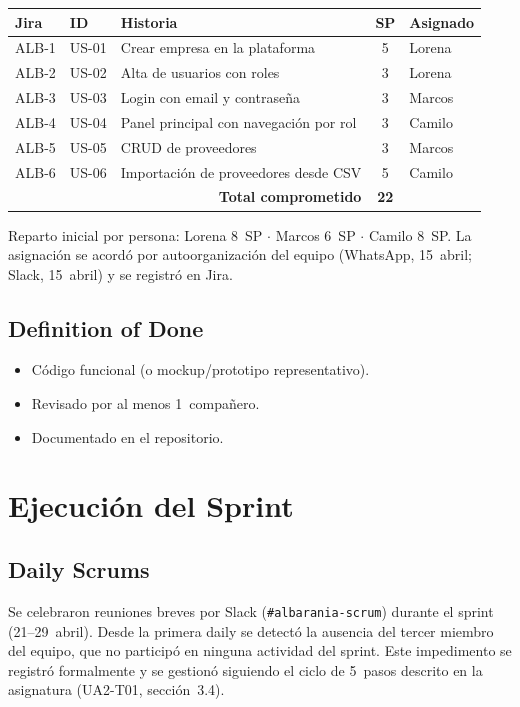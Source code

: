 \documentclass[11pt,a4paper]{article}
\begin{document}
\begin{center}
\begin{tabular}{lllcl}
\toprule
\textbf{Jira} & \textbf{ID} & \textbf{Historia} & \textbf{SP} & \textbf{Asignado} \\
\midrule
ALB-1 & US-01 & Crear empresa en la plataforma       & 5 & Lorena \\
ALB-2 & US-02 & Alta de usuarios con roles           & 3 & Lorena \\
ALB-3 & US-03 & Login con email y contraseña         & 3 & Marcos \\
ALB-4 & US-04 & Panel principal con navegación por rol & 3 & Camilo \\
ALB-5 & US-05 & CRUD de proveedores                  & 3 & Marcos \\
ALB-6 & US-06 & Importación de proveedores desde CSV & 5 & Camilo \\
\midrule
\multicolumn{3}{r}{\textbf{Total comprometido}} & \textbf{22} & \\
\bottomrule
\end{tabular}
\end{center}

Reparto inicial por persona: Lorena 8~SP $\cdot$ Marcos 6~SP $\cdot$ Camilo 8~SP. La asignación se acordó por autoorganización del equipo (WhatsApp, 15~abril; Slack, 15~abril) y se registró en Jira.

\subsection{Definition of Done}
\begin{itemize}
\item Código funcional (o mockup/prototipo representativo).
\item Revisado por al menos 1~compañero.
\item Documentado en el repositorio.
\end{itemize}

\section{Ejecución del Sprint}

\subsection{Daily Scrums}
Se celebraron reuniones breves por Slack (\texttt{\#albarania-scrum}) durante el sprint (21--29~abril). Desde la primera daily se detectó la ausencia del tercer miembro del equipo, que no participó en ninguna actividad del sprint. Este impedimento se registró formalmente y se gestionó siguiendo el ciclo de 5~pasos descrito en la asignatura (UA2-T01, sección~3.4).
\end{document}
